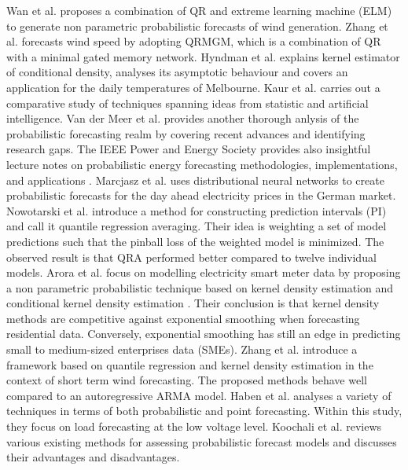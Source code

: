 Wan et al. \cite{wan2016direct} proposes a combination of QR and extreme learning machine (ELM) to generate non parametric probabilistic forecasts of wind generation.
Zhang et al. \cite{zhang2019wind} forecasts wind speed by adopting QRMGM, which is a combination of QR with a minimal gated memory network.
Hyndman et al. \cite{hyndman1996estimating} explains kernel estimator of conditional density, analyses its asymptotic behaviour and covers an application for the daily temperatures of Melbourne.
Kaur et al. \cite{kaur2022energy} carries out a comparative study of techniques spanning ideas from statistic and artificial intelligence.
Van der Meer et al. \cite{van2018review} provides another thorough anlysis of the probabilistic forecasting realm by covering recent advances and identifying research gaps.
The IEEE Power and Energy Society provides also insightful lecture notes on probabilistic energy forecasting methodologies,
implementations, and applications .
Marcjasz et al. \cite{probablistic_electricity_forecast2} uses distributional neural networks to create probabilistic forecasts for the day ahead electricity prices in the German market.
Nowotarski et al. \cite{nowotarski2015computing} introduce a method for constructing prediction intervals (PI) and call it quantile regression averaging. Their idea is weighting a set of model predictions such that the pinball loss of the weighted model is minimized. The observed result is that QRA performed better compared to twelve individual models.
Arora et al. \cite{arora2016forecasting} focus on modelling electricity smart meter data by proposing a non parametric probabilistic technique based on kernel density estimation and conditional kernel density estimation \cite{rosenblatt1969conditional, hyndman1996estimating}. Their conclusion is that kernel density methods are competitive against exponential smoothing when forecasting residential data. Conversely, exponential smoothing has still an edge in predicting small to medium-sized enterprises data (SMEs).
Zhang et al. \cite{zhang2020probability} introduce a framework based on quantile regression and kernel density estimation in the context of short term wind forecasting. The proposed methods behave well compared to an autoregressive ARMA model.
Haben et al. \cite{haben2018short} analyses a variety of techniques in terms of both probabilistic and point forecasting. Within this study, they focus on load forecasting at the low voltage level.
Koochali et al. \cite{koochali2022random} reviews various existing methods for assessing probabilistic forecast models and discusses their advantages and disadvantages.

